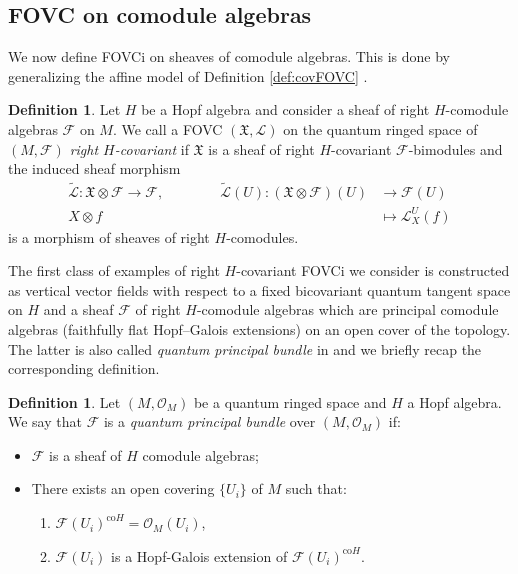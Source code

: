 \documentclass{article}
\theoremstyle{definition}
\newtheorem{definition}[thm]{Definition}
\newcommand{\cO}{{\mathcal{O}}}
\newcommand{\cF}{{\mathcal{F}}}
\begin{document}
\subsection{FOVC on comodule algebras}\label{sec:sheafVertical}

We now define FOVCi on sheaves of comodule algebras. This is done by generalizing the affine model of Definition \ref{def:covFOVC} .

\begin{definition}
Let $H$ be a Hopf algebra and consider a sheaf of right $H$-comodule algebras $\mathcal{F}$ on $M$. 
We call a FOVC $(\mathfrak{X},\mathscr{L})$ on the quantum ringed space of $(M,\mathcal{F})$ \textit{right $H$-covariant} if $\mathfrak{X}$ is a sheaf of right $H$-covariant $\mathcal{F}$-bimodules and the induced sheaf morphism
\begin{equation}
	\begin{split}
		\widetilde{\mathscr{L}}\colon\mathfrak{X}\otimes\mathcal{F}\to\mathcal{F},\qquad\qquad\widetilde{\mathscr{L}}(U)\colon(\mathfrak{X}\otimes\mathcal{F})(U)&\to\mathcal{F}(U)\\
		X\otimes f&\mapsto\mathscr{L}^U_X(f)
	\end{split}
\end{equation}
is a morphism of sheaves of right $H$-comodules.
\end{definition}



The first class of examples of right $H$-covariant FOVCi we consider is constructed as vertical vector fields with respect to a fixed bicovariant quantum tangent space on $H$ and a sheaf $\mathcal{F}$ of right $H$-comodule algebras which are principal comodule algebras (faithfully flat Hopf--Galois extensions) on an open cover of the topology. The latter is also called \textit{quantum principal bundle} in \cite{afl} and we briefly recap the corresponding definition.
\begin{definition}\label{hg-shf} 
Let $(M,\cO_M)$ be a quantum ringed space and $H$ a Hopf algebra. 
We say that $\cF$ 
is a \textit{quantum principal bundle} over $(M,\cO_M)$
if:
\begin{itemize}
	\item $\cF$ is a sheaf of $H$ comodule algebras;
	\item There exists an open covering 
	$\{U_i\}$ of $M$ such that:
	\begin{enumerate}
		\item $\cF(U_i)^{\mathrm{co} H}=\cO_M(U_i)$,
		\item %
		$\cF (U_i )$ is a Hopf-Galois 
		extension of 
		$\cF(U_i)^{\mathrm{co} H}$.
	\end{enumerate}
\end{itemize}
\end{definition}
\end{document}
